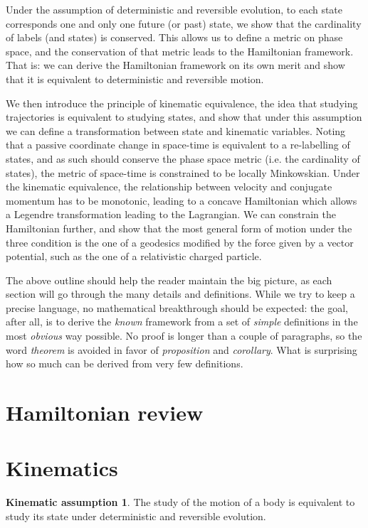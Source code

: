 \documentclass[aps,pra,10pt,twocolumn,floatfix,nofootinbib]{revtex4-1}
\theoremstyle{definition}
\newtheorem*{assump3}{Kinematic assumption}
\begin{document}
Under the assumption of deterministic and reversible evolution, to each state corresponds one and only one future (or past) state, we show that the cardinality of labels (and states) is conserved. This allows us to define a metric on phase space, and the conservation of that metric leads to the Hamiltonian framework. That is: we can derive the Hamiltonian framework on its own merit and show that it is equivalent to deterministic and reversible motion.

We then introduce the principle of kinematic equivalence, the idea that studying trajectories is equivalent to studying states, and show that under this assumption we can define a transformation between state and kinematic variables. Noting that a passive coordinate change in space-time is equivalent to a re-labelling of states, and as such should conserve the phase space metric (i.e. the cardinality of states), the metric of space-time is constrained to be locally Minkowskian. Under the kinematic equivalence, the relationship between velocity and conjugate momentum has to be monotonic, leading to a concave Hamiltonian which allows a Legendre transformation leading to the Lagrangian. We can constrain the Hamiltonian further, and show that the most general form of motion under the three condition is the one of a geodesics modified by the force given by a vector potential, such as the one of a relativistic charged particle.

The above outline should help the reader maintain the big picture, as each section will go through the many details and definitions. While we try to keep a precise language, no mathematical breakthrough should be expected: the goal, after all, is to derive the \emph{known} framework from a set of \emph{simple} definitions in the most \emph{obvious} way possible. No proof is longer than a couple of paragraphs, so the word \emph{theorem} is avoided in favor of \emph{proposition} and \emph{corollary}. What is surprising how so much can be derived from very few definitions.


\section{Hamiltonian review}

\section{Kinematics}
\begin{assump3}\label{kinematicAssumption}
The study of the motion of a body is equivalent to study its state under deterministic and reversible evolution.
\end{assump3}
\end{document}
